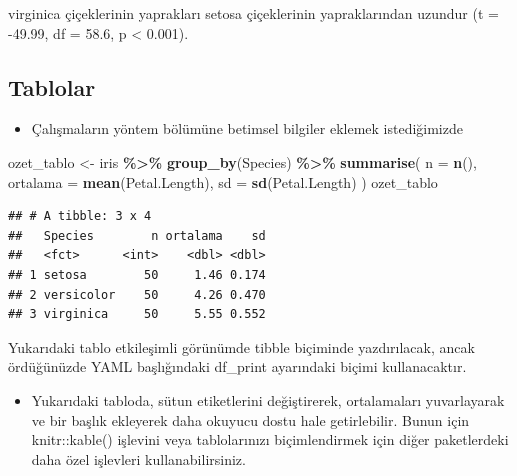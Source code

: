 \documentclass[
  oneside]{book}
\newenvironment{Shaded}{\begin{snugshade}}{\end{snugshade}}
\newcommand{\AttributeTok}[1]{\textcolor[rgb]{0.13,0.29,0.53}{#1}}
\newcommand{\FunctionTok}[1]{\textcolor[rgb]{0.13,0.29,0.53}{\textbf{#1}}}
\newcommand{\NormalTok}[1]{#1}
\newcommand{\OtherTok}[1]{\textcolor[rgb]{0.56,0.35,0.01}{#1}}
\newcommand{\SpecialCharTok}[1]{\textcolor[rgb]{0.81,0.36,0.00}{\textbf{#1}}}
\providecommand{\tightlist}{%
  \setlength{\itemsep}{0pt}\setlength{\parskip}{0pt}}
\begin{document}
virginica çiçeklerinin yaprakları setosa çiçeklerinin yapraklarından uzundur (t = -49.99, df = 58.6, p \textless{} 0.001).

\hypertarget{repro-tables}{%
\subsection{Tablolar}\label{repro-tables}}

\begin{itemize}
\tightlist
\item
  Çalışmaların yöntem bölümüne betimsel bilgiler eklemek istediğimizde
\end{itemize}

\begin{Shaded}
\begin{Highlighting}[]
\NormalTok{ozet\_tablo }\OtherTok{\textless{}{-}}\NormalTok{ iris }\SpecialCharTok{\%\textgreater{}\%}
  \FunctionTok{group\_by}\NormalTok{(Species) }\SpecialCharTok{\%\textgreater{}\%}
  \FunctionTok{summarise}\NormalTok{(}
    \AttributeTok{n =} \FunctionTok{n}\NormalTok{(),}
    \AttributeTok{ortalama =} \FunctionTok{mean}\NormalTok{(Petal.Length),}
    \AttributeTok{sd =} \FunctionTok{sd}\NormalTok{(Petal.Length)}
\NormalTok{  )}
\NormalTok{ozet\_tablo}
\end{Highlighting}
\end{Shaded}

\begin{verbatim}
## # A tibble: 3 x 4
##   Species        n ortalama    sd
##   <fct>      <int>    <dbl> <dbl>
## 1 setosa        50     1.46 0.174
## 2 versicolor    50     4.26 0.470
## 3 virginica     50     5.55 0.552
\end{verbatim}

\begin{warning}
Yukarıdaki tablo etkileşimli görünümde tibble biçiminde yazdırılacak, ancak ördüğünüzde YAML başlığındaki df\_print ayarındaki biçimi kullanacaktır.

\end{warning}

\begin{itemize}
\tightlist
\item
  Yukarıdaki tabloda, sütun etiketlerini değiştirerek, ortalamaları yuvarlayarak ve bir başlık ekleyerek daha okuyucu dostu hale getirlebilir. Bunun için {{knitr}{::}{kable}{(}{)}} işlevini veya tablolarınızı biçimlendirmek için diğer paketlerdeki daha özel işlevleri kullanabilirsiniz.
\end{itemize}
\end{document}
